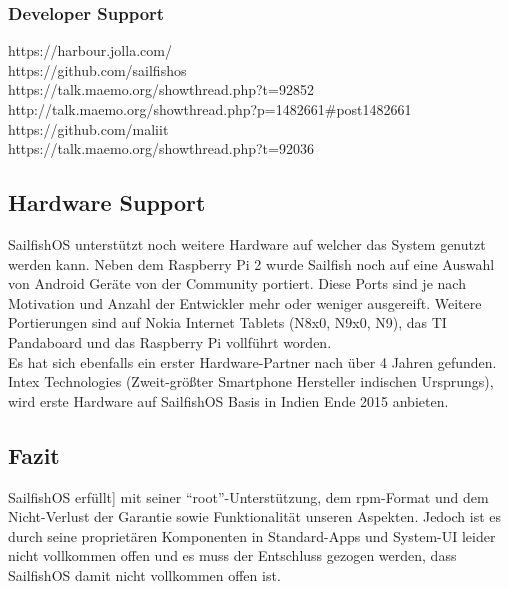 \subsubsection{Developer Support}
\cite{online:jolla-store-terms}
https://harbour.jolla.com/\\
https://github.com/sailfishos\\
https://talk.maemo.org/showthread.php?t=92852\\
http://talk.maemo.org/showthread.php?p=1482661\#post1482661\\
https://github.com/maliit\\
https://talk.maemo.org/showthread.php?t=92036\\
\fi

\subsection{Hardware Support}
\mbox{SailfishOS} unterstützt noch weitere Hardware auf welcher das System genutzt werden kann. Neben dem Raspberry Pi 2\cite{online:sailfish-rpi2} wurde Sailfish noch auf eine Auswahl von Android Geräte von der Community\cite{online:sailfish-android-port} portiert. Diese Ports sind je nach Motivation und Anzahl der Entwickler mehr oder weniger ausgereift\cite{online:sailfish-porters}. Weitere Portierungen sind auf Nokia Internet Tablets (N8x0, N9x0, N9), das TI Pandaboard und das Raspberry Pi vollführt worden.\\
Es hat sich ebenfalls ein erster Hardware-Partner nach über 4 Jahren gefunden. Intex Technologies (Zweit-größter Smartphone Hersteller indischen Ursprungs), wird erste Hardware auf \mbox{SailfishOS} Basis in Indien Ende 2015 anbieten\cite{online:jolla-intex-pdf}.\\

\subsection{Fazit}
\mbox{SailfishOS} erfüllt] mit seiner ``root''-Unterstützung, dem rpm-Format und dem Nicht-Verlust der Garantie sowie Funktionalität unseren Aspekten. Jedoch ist es durch seine proprietären Komponenten in Standard-Apps und System-UI leider nicht vollkommen offen und es muss der Entschluss gezogen werden, dass SailfishOS damit nicht vollkommen offen ist.